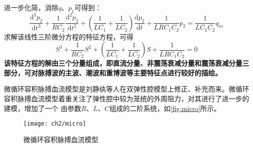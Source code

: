 进一步化简，消除$q$、$p_{1}$可得到：
\begin{equation}
    \label{equ:diff}
    \frac{\mathrm{d^3} p_{2}}{\mathrm{d} t^3}+\frac{1}{RC_{2}}\frac{\mathrm{d}^2p_{2} }{\mathrm{d} t^2}+
    (\frac{1}{LC_{1}}+\frac{1}{LC_{2}})\frac{\mathrm{d} p_{2}}{\mathrm{d} t}+\frac{1}{LRC_{1}C_{2}}p_{2}
    =\frac{1}{LC_{1}C_{2}}q_{in}
\end{equation}
求解该线性三阶微分方程的特征方程，可得
\begin{equation}
    \label{equ:character}
    S^3+\frac{1}{RC_{2}}S^2+(\frac{1}{LC_{1}}+\frac{1}{LC_{2}})S+\frac{1}{LRC_{1}C_{2}}=0
\end{equation}
\textbf{该特征方程的解由三个分量组成，即直流分量、非震荡衰减分量和震荡衰减分量三部分，可对脉搏波的主波、潮波和重博波等主要特征点进行较好的描绘。}

微循环容积脉搏血流模型是刘静纨等人\cite{Liu2001}在双弹性腔模型上修正、补充而来。微循环容积脉搏血流模型着重关注了弹性腔中较为笼统的外周阻力，对其进行了进一步的建模，增加了一个
由参数$R$、$L$、$C$组成的二阶系统，如\autoref{fig:micro}所示。
\begin{figure}[htbp]
    \centering
    \texttt{[image: ch2/micro]}
    \caption{\label{fig:micro}微循环容积脉搏血流模型}
\end{figure}

